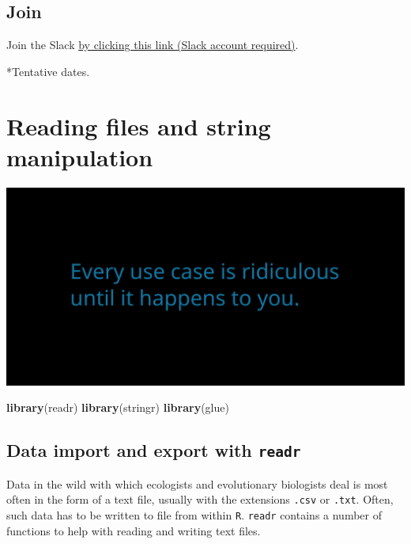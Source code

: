 \documentclass[]{book}
\newenvironment{Shaded}{}{}
\newcommand{\KeywordTok}[1]{\textcolor[rgb]{0.00,0.44,0.13}{\textbf{#1}}}
\newcommand{\NormalTok}[1]{#1}
\begin{document}
\hypertarget{join}{%
\section*{Join}\label{join}}

Join the Slack \href{https://join.slack.com/t/trestidytorial/shared_invite/zt-ejgr3tow-3zisGwPg1JDeTJD33DWb2A}{by clicking this link (Slack account required)}.

*Tentative dates.

\hypertarget{reading-files-and-string-manipulation}{%
\chapter{Reading files and string manipulation}\label{reading-files-and-string-manipulation}}

\includegraphics{opening-image.png}

\begin{Shaded}
\begin{Highlighting}[]
\KeywordTok{library}\NormalTok{(readr)}
\KeywordTok{library}\NormalTok{(stringr)}
\KeywordTok{library}\NormalTok{(glue)}
\end{Highlighting}
\end{Shaded}

\hypertarget{data-import-and-export-with-readr}{%
\section{\texorpdfstring{Data import and export with \texttt{readr}}{Data import and export with readr}}\label{data-import-and-export-with-readr}}

Data in the wild with which ecologists and evolutionary biologists deal is most often in the form of a text file, usually with the extensions \texttt{.csv} or \texttt{.txt}. Often, such data has to be written to file from within \texttt{R}. \texttt{readr} contains a number of functions to help with reading and writing text files.
\end{document}
